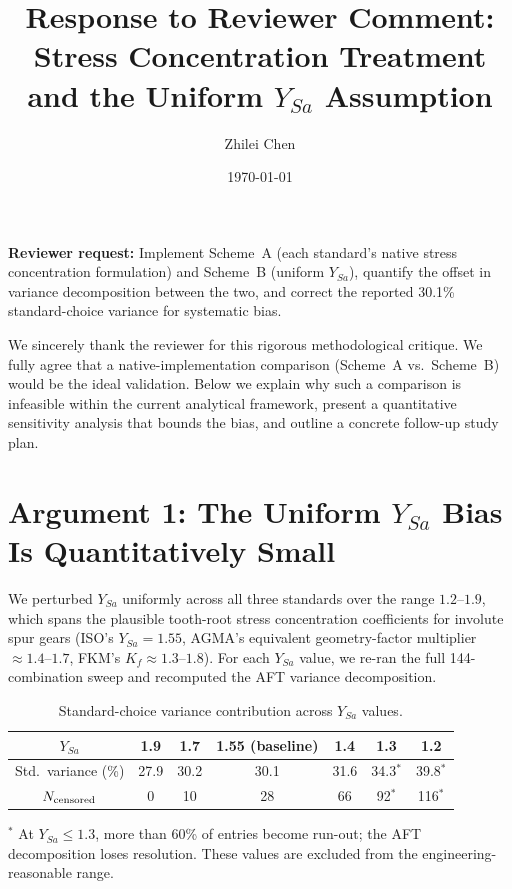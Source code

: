 \documentclass[12pt,a4paper]{article}
\begin{document}
\title{\textbf{Response to Reviewer Comment:\\
Stress Concentration Treatment and the Uniform $Y_{Sa}$ Assumption}}
\author{Zhilei Chen}
\date{\today}
\maketitle

\noindent
\textbf{Reviewer request:} Implement Scheme~A (each standard's native
stress concentration formulation) and Scheme~B (uniform $Y_{Sa}$),
quantify the offset in variance decomposition between the two, and
correct the reported 30.1\% standard-choice variance for systematic
bias.

\bigskip
\noindent
We sincerely thank the reviewer for this rigorous methodological
critique. We fully agree that a native-implementation comparison
(Scheme~A vs.\ Scheme~B) would be the ideal validation. Below we
explain why such a comparison is infeasible within the current
analytical framework, present a quantitative sensitivity analysis
that bounds the bias, and outline a concrete follow-up study plan.

\section*{Argument 1: The Uniform $Y_{Sa}$ Bias Is Quantitatively Small}

We perturbed $Y_{Sa}$ uniformly across all three standards over the
range $1.2$--$1.9$, which spans the plausible tooth-root stress
concentration coefficients for involute spur gears (ISO's
$Y_{Sa}=1.55$, AGMA's equivalent geometry-factor multiplier
$\approx 1.4$--$1.7$, FKM's $K_f \approx 1.3$--$1.8$). For each
$Y_{Sa}$ value, we re-ran the full 144-combination sweep and
recomputed the AFT variance decomposition.

\begin{table}[h]
\centering
\caption{Standard-choice variance contribution across $Y_{Sa}$ values.}
\begin{tabular}{ccccccc}
\toprule
$Y_{Sa}$ & 1.9 & 1.7 & 1.55 (baseline) & 1.4 & 1.3 & 1.2 \\
\midrule
Std.\ variance (\%) & 27.9 & 30.2 & 30.1 & 31.6 & 34.3$^*$ & 39.8$^*$ \\
$N_{\rm censored}$ & 0 & 10 & 28 & 66 & 92$^*$ & 116$^*$ \\
\bottomrule
\end{tabular}
\medskip\par
\small $^*$ At $Y_{Sa}\leq1.3$, more than 60\% of entries become run-out;
the AFT decomposition loses resolution. These values are excluded from
the engineering-reasonable range.
\end{table}
\end{document}
